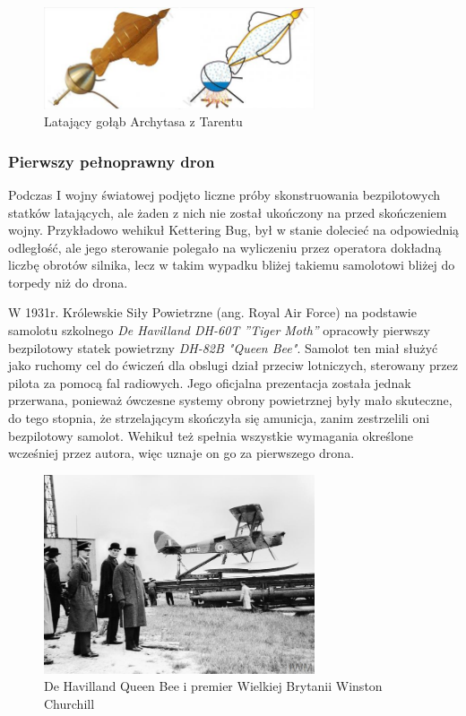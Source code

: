\begin{figure}[!ht]
  \centering
  \includegraphics[width=8cm]{./Obrazy/golab.jpg}
  \caption{Latający gołąb Archytasa z Tarentu}
  \end{figure}

\subsubsection{Pierwszy pełnoprawny dron}

\hspace{1cm}Podczas I wojny światowej podjęto liczne próby skonstruowania bezpilotowych statków latających, ale żaden z nich nie został ukończony na przed skończeniem wojny. Przykładowo wehikuł Kettering Bug, był w stanie dolecieć na odpowiednią odległość, ale jego sterowanie polegało na wyliczeniu przez operatora dokładną liczbę obrotów silnika, lecz w takim wypadku bliżej takiemu samolotowi bliżej do torpedy niż do drona. 

W 1931r. Królewskie Siły Powietrzne (ang. Royal Air Force) na podstawie samolotu szkolnego \textit{De Havilland DH-60T ”Tiger Moth”} opracowły pierwszy bezpilotowy statek powietrzny \textit{DH-82B "Queen Bee"}. Samolot ten miał służyć jako ruchomy cel do ćwiczeń dla obslugi dział przeciw lotniczych, sterowany przez pilota za pomocą fal radiowych. Jego oficjalna prezentacja została jednak przerwana, ponieważ ówczesne systemy obrony powietrznej były mało skuteczne, do tego stopnia, że strzelającym skończyła się amunicja, zanim zestrzelili oni bezpilotowy samolot. Wehikuł też spełnia wszystkie wymagania określone wcześniej przez autora, więc uznaje on go za pierwszego drona.\cite{queen-bee}\cite{dron-ibuk}

\begin{figure}[!ht]
  \centering
  \includegraphics[width=8cm]{./Obrazy/queen-bee.jpg}
  \caption{De Havilland Queen Bee i premier Wielkiej Brytanii Winston Churchill}
  \end{figure}

